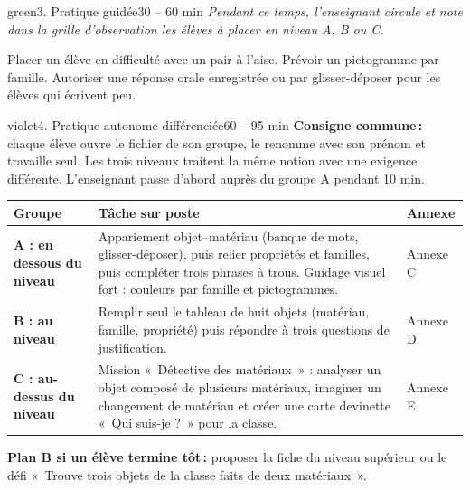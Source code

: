 \documentclass[11pt,a4paper]{article}
\begin{document}
\begin{etape}{green}{3. Pratique guidée}{30 -- 60 min}
\textit{Pendant ce temps, l'enseignant circule et note dans la grille d'observation les élèves à placer en niveau A, B ou C.}

\begin{astuce}
Placer un élève en difficulté avec un pair à l'aise. Prévoir un pictogramme par famille. Autoriser une réponse orale enregistrée ou par glisser-déposer pour les élèves qui écrivent peu.
\end{astuce}
\end{etape}

\begin{etape}{violet}{4. Pratique autonome différenciée}{60 -- 95 min}
\textbf{Consigne commune\,:} chaque élève ouvre le fichier de son groupe, le renomme avec son prénom et travaille seul. Les trois niveaux traitent la même notion avec une exigence différente. L'enseignant passe d'abord auprès du groupe A pendant 10 min.

\medskip
\begin{tabularx}{\linewidth}{>{\bfseries}p{3cm}Y p{3.2cm}}
\toprule
Groupe & Tâche sur poste & Annexe\\
\midrule
A : en dessous du niveau &
Appariement objet--matériau (banque de mots, glisser-déposer), puis relier propriétés et familles, puis compléter trois phrases à trous. Guidage visuel fort : couleurs par famille et pictogrammes. & Annexe C\\
B : au niveau &
Remplir seul le tableau de huit objets (matériau, famille, propriété) puis répondre à trois questions de justification. & Annexe D\\
C : au-dessus du niveau &
Mission «~Détective des matériaux~» : analyser un objet composé de plusieurs matériaux, imaginer un changement de matériau et créer une carte devinette «~Qui suis-je ?~» pour la classe. & Annexe E\\
\bottomrule
\end{tabularx}

\medskip
\textbf{Plan B si un élève termine tôt\,:} proposer la fiche du niveau supérieur ou le défi «~Trouve trois objets de la classe faits de deux matériaux~».
\end{etape}
\end{document}
